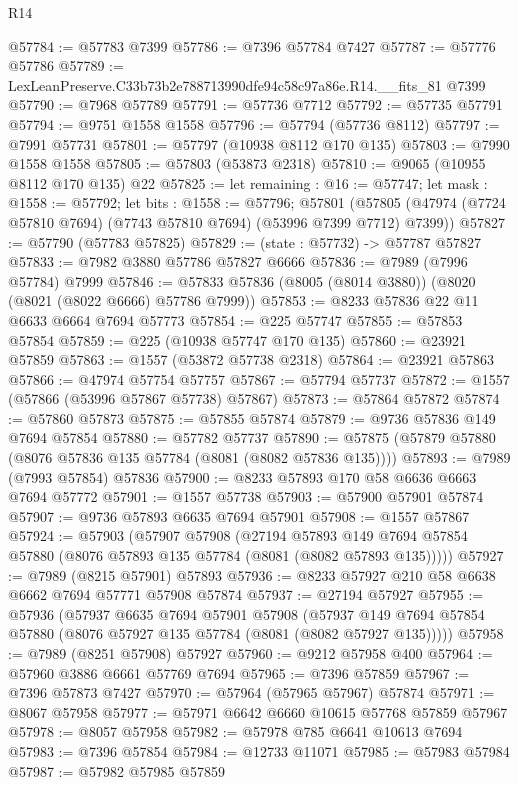 \begin{lexlean}{R14}
\begin{coremodule}
@57784 := @57783 @7399
@57786 := @7396 @57784 @7427
@57787 := @57776 @57786
@57789 := LexLeanPreserve.C33b73b2e788713990dfe94c58c97a86e.R14.__fits_81 @7399
@57790 := @7968 @57789
@57791 := @57736 @7712
@57792 := @57735 @57791
@57794 := @9751 @1558 @1558
@57796 := @57794 (@57736 @8112)
@57797 := @7991 @57731
@57801 := @57797 (@10938 @8112 @170 @135)
@57803 := @7990 @1558 @1558
@57805 := @57803 (@53873 @2318)
@57810 := @9065 (@10955 @8112 @170 @135) @22
@57825 := let remaining : @16 := @57747;
  let mask : @1558 := @57792;
  let bits : @1558 := @57796;
  @57801 (@57805 (@47974 (@7724 @57810 @7694) (@7743 @57810 @7694) (@53996 @7399 @7712) @7399))
@57827 := @57790 (@57783 @57825)
@57829 := (state : @57732) -> @57787 @57827
@57833 := @7982 @3880 @57786 @57827 @6666
@57836 := @7989 (@7996 @57784) @7999
@57846 := @57833 @57836 (@8005 (@8014 @3880)) (@8020 (@8021 (@8022 @6666) @57786 @7999))
@57853 := @8233 @57836 @22 @11 @6633 @6664 @7694 @57773
@57854 := @225 @57747
@57855 := @57853 @57854
@57859 := @225 (@10938 @57747 @170 @135)
@57860 := @23921 @57859
@57863 := @1557 (@53872 @57738 @2318)
@57864 := @23921 @57863
@57866 := @47974 @57754 @57757
@57867 := @57794 @57737
@57872 := @1557 (@57866 (@53996 @57867 @57738) @57867)
@57873 := @57864 @57872
@57874 := @57860 @57873
@57875 := @57855 @57874
@57879 := @9736 @57836 @149 @7694 @57854
@57880 := @57782 @57737
@57890 := @57875 (@57879 @57880 (@8076 @57836 @135 @57784 (@8081 (@8082 @57836 @135))))
@57893 := @7989 (@7993 @57854) @57836
@57900 := @8233 @57893 @170 @58 @6636 @6663 @7694 @57772
@57901 := @1557 @57738
@57903 := @57900 @57901 @57874
@57907 := @9736 @57893 @6635 @7694 @57901
@57908 := @1557 @57867
@57924 := @57903
    (@57907
      @57908
      (@27194
        @57893
        @149
        @7694
        @57854
        @57880
        (@8076 @57893 @135 @57784 (@8081 (@8082 @57893 @135)))))
@57927 := @7989 (@8215 @57901) @57893
@57936 := @8233 @57927 @210 @58 @6638 @6662 @7694 @57771 @57908 @57874
@57937 := @27194 @57927
@57955 := @57936
    (@57937
      @6635
      @7694
      @57901
      @57908
      (@57937 @149 @7694 @57854 @57880 (@8076 @57927 @135 @57784 (@8081 (@8082 @57927 @135)))))
@57958 := @7989 (@8251 @57908) @57927
@57960 := @9212 @57958 @400
@57964 := @57960 @3886 @6661 @57769 @7694
@57965 := @7396 @57859
@57967 := @7396 @57873 @7427
@57970 := @57964 (@57965 @57967) @57874
@57971 := @8067 @57958
@57977 := @57971 @6642 @6660 @10615 @57768 @57859 @57967
@57978 := @8057 @57958
@57982 := @57978 @785 @6641 @10613 @7694
@57983 := @7396 @57854
@57984 := @12733 @11071
@57985 := @57983 @57984
@57987 := @57982 @57985 @57859

\end{coremodule}
\end{lexlean}
